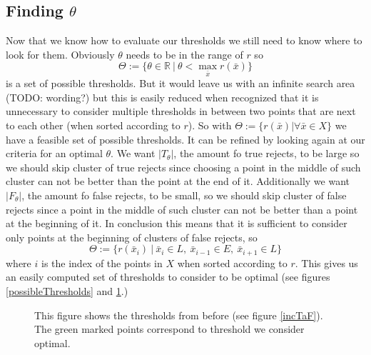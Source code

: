 \subsection{Finding $\theta$}
\label{findt}
Now that we know how to evaluate our thresholds we still need to know where to look for them. Obviously $\theta$ needs to be in the range of $r$ so
$$ \Theta := \{\theta \in \mathbb{R} \ | \ \theta < \operatorname*{max}_{\bar{x}} r(\bar{x})\}  $$
is a set of possible thresholds. But it would leave us with an infinite search area (TODO: wording?) but this is easily reduced when recognized that it is unnecessary to consider multiple thresholds in between two points that are next to each other (when sorted according to $r$). So with $\Theta := \{r(\bar{x}) | \forall \bar{x} \in X\}$ we have a feasible set of possible thresholds. It can be refined by looking again at our criteria for an optimal $\theta$. We want $|T_\theta|$, the amount fo true rejects, to be large so we should skip cluster of true rejects since choosing a point in the middle of such cluster can not be better than the point at the end of it. Additionally we want  $|F_\theta|$, the amount fo false rejects, to be small, so we should skip cluster of false rejects since a point in the middle of such cluster can not be better than a point at the beginning of it. In conclusion this means that it is sufficient to consider only points at the beginning of clusters of false rejects, so
$$ \Theta := \{r(\bar{x}_i) \ | \ \bar{x}_i \in L, \ \bar{x}_{i-1} \in E,\ \bar{x}_{i+1} \in L \} $$
where $i$ is the index of the points in $X$ when sorted according to $r$. This gives us an easily computed set of thresholds to consider to be optimal (see figures \ref{possibleThresholds} and \ref{paretoFront}.)

\begin{figure}[!htbp]
\centering
\caption{This figure shows the thresholds from before (see figure \ref{incTaF}). The green marked points correspond to threshold we consider optimal.}
\label{paretoFront}
\end{figure}

